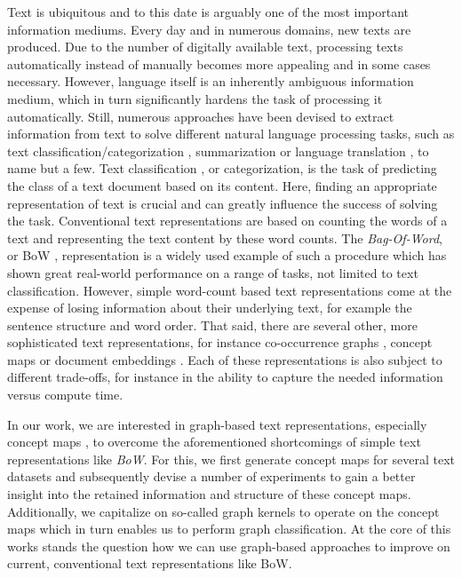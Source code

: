 Text is ubiquitous and to this date is arguably one of the most important information mediums.
Every day and in numerous domains, new texts are produced.
Due to the number of digitally available text, processing texts automatically instead of manually becomes more appealing and in some cases necessary.
However, language itself is an inherently ambiguous information medium, which in turn significantly hardens the task of processing it automatically.
Still, numerous approaches have been devised to extract information from text to solve different natural language processing tasks, such as text classification/categorization \cite[p.~575]{Manning2000}, summarization \cite{Mani1999} or language translation \cite{Weaver1955}, to name but a few.
Text classification \cite[p.~232]{Manning2000}, or categorization, is the task of predicting the class of a text document based on its content.
Here, finding an appropriate representation of text is crucial and can greatly influence the success of solving the task.
Conventional text representations are based on counting the words of a text and representing the text content by these word counts.
The \textit{Bag-Of-Word}, or BoW \cite[p.~237]{Manning2000}, representation is a widely used example of such a procedure which has shown great real-world performance on a range of tasks, not limited to text classification.
However, simple word-count based text representations come at the expense of losing information about their underlying text, for example the sentence structure and word order.
That said, there are several other, more sophisticated text representations, for instance 
 co-occurrence graphs \cite{Rousseau2013}, concept maps \cite{Novak2008,Falke2017b} or document embeddings \cite{Dai2015,Lau2016}.
Each of these representations is also subject to different trade-offs, for instance in the ability to capture the needed information versus compute time.

In our work, we are interested in graph-based text representations, especially concept maps \cite{Novak2008}, to overcome the aforementioned shortcomings of simple text representations like \textit{BoW}.
For this, we first generate concept maps for several text datasets and subsequently devise a number of experiments to gain a better insight into the retained information and structure of these concept maps.
Additionally, we capitalize on so-called graph kernels \cite{Kulharia2008} to operate on the concept maps which in turn enables us to perform graph classification.
At the core of this works stands the question how we can use graph-based approaches to improve on current, conventional text representations like BoW.

